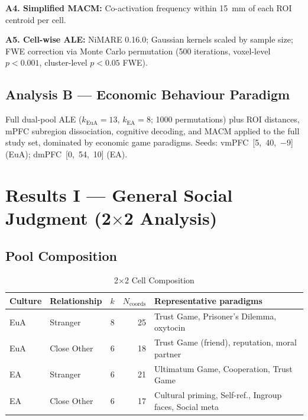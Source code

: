 \documentclass[11pt,a4paper]{report}
\begin{document}
\textbf{A4. Simplified MACM:} Co-activation frequency within 15~mm of each ROI centroid
per cell.

\textbf{A5. Cell-wise ALE:} NiMARE 0.16.0; Gaussian kernels scaled by sample size;
FWE correction via Monte Carlo permutation (500 iterations, voxel-level $p<0.001$,
cluster-level $p<0.05$ FWE).

\section*{Analysis B --- Economic Behaviour Paradigm}

Full dual-pool ALE ($k_{\text{EuA}}=13$, $k_{\text{EA}}=8$; 1000 permutations) plus ROI
distances, mPFC subregion dissociation, cognitive decoding, and MACM applied to the full
study set, dominated by economic game paradigms. Seeds: vmPFC~[5,~40,~$-$9] (EuA);
dmPFC~[0,~54,~10] (EA).

\chapter{Results I --- General Social Judgment (2$\times$2 Analysis)}

\section*{Pool Composition}

\begin{table}[ht]
\centering\small
\caption{2$\times$2 Cell Composition}
\label{tab:pools}
\begin{tabular}{llrrp{6.5cm}}
\toprule
\textbf{Culture} & \textbf{Relationship} & $k$ & $N_{\text{coords}}$ & Representative paradigms \\
\midrule
\textcolor{euaBlue}{EuA} & Stranger    & 8 & 25 & Trust Game, Prisoner's Dilemma, oxytocin \\
\textcolor{euaBlue}{EuA} & Close Other & 6 & 18 & Trust Game (friend), reputation, moral partner \\
\textcolor{eaRed}{EA}    & Stranger    & 6 & 21 & Ultimatum Game, Cooperation, Trust Game \\
\textcolor{eaRed}{EA}    & Close Other & 6 & 17 & Cultural priming, Self-ref., Ingroup faces, Social meta \\
\bottomrule
\end{tabular}
\end{table}
\end{document}
